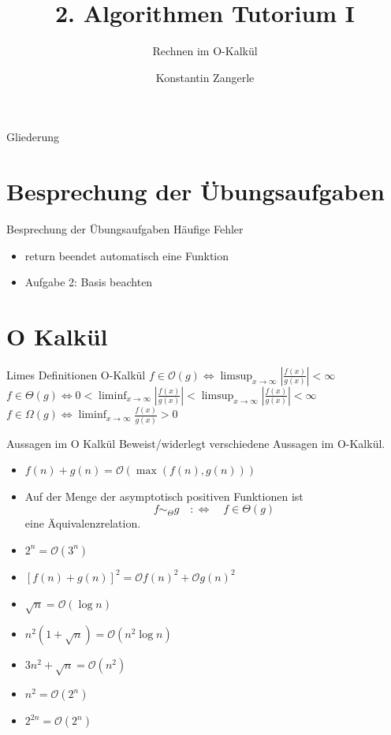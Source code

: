 \documentclass[18pt]{beamer}
\title[Algo I Tut]{2. Algorithmen Tutorium I}
\subtitle{Rechnen im O-Kalkül}
\author[Zangerle]{Konstantin Zangerle}
\institute{Institut für Theoretische Informatik}
\newcommand{\Oh}{\mathcal{O}}
\begin{document}

\begin{frame}
\titlepage
\end{frame}

\begin{frame}{Gliederung}
 \tableofcontents
\end{frame}

\section{Besprechung der Übungsaufgaben}
\begin{frame}{Besprechung der Übungsaufgaben}
Häufige Fehler
\begin{itemize}
 \item return beendet automatisch eine Funktion
 \item Aufgabe 2: Basis beachten
\end{itemize}

\end{frame}

\section{O Kalkül}
\begin{frame}{Limes Definitionen O-Kalkül}
 $f \in \Oh(g) \iff \limsup_{x \to \infty}| \frac{f(x)}{g(x)}| < \infty$ \\
 $f \in \Theta(g) \iff 0 < \liminf_{x \to \infty} | \frac{f(x)}{g(x)} |< \limsup_{x \to \infty} |\frac{f(x)}{g(x)} |< \infty$ \\
 $f \in \Omega(g) \iff \liminf_{x \to \infty} \frac{f(x)}{g(x)} > 0$ \\
\end{frame}

\begin{frame}{Aussagen im O Kalkül}
Beweist/widerlegt verschiedene Aussagen im O-Kalkül.
  \begin{itemize}
    \item $f(n) + g(n) = \Oh({\max(f(n),g(n))})$
    \item Auf der Menge der asymptotisch positiven Funktionen ist 
      $$f \sim_{\Theta} g \quad:\Longleftrightarrow\quad f \in \Theta(g)$$
      eine Äquivalenzrelation.
    \item $2^{n} = \Oh({3^n})$
    \item $[ f(n) + g(n) ]^2 = \Oh{f(n)^2} + \Oh{g(n)^2}$
    \item $\sqrt{n} = \Oh({{\log n}})$
    \item $n^2(1+\sqrt{n}) = \Oh({n^2 \log n})$
    \item $3n^2 + \sqrt{n} = \Oh({n^2})$
    \item $n^2 = \Oh({2^n})$
    \item $2^{2n} = \Oh({2^n})$
  \end{itemize}
\end{frame}
\end{document}
